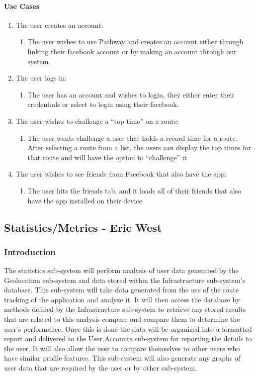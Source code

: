 ﻿\documentclass{article}
\begin{document}
\paragraph{Use Cases}
\begin{enumerate}
\item The user creates an account:
    \begin{enumerate}
    \item The user wishes to use Pathway and creates an account either through linking their facebook account or by making an account through our system.
    \end{enumerate}
\item The user logs in:
    \begin{enumerate}
    \item The user has an account and wishes to login, they either enter their credentials or select to login using their facebook.
    \end{enumerate}
\item The user wishes to challenge a “top time” on a route:
    \begin{enumerate}
    \item The user wants challenge a user that holds a record time for a route. After selecting a route from a list, the users can display the top times for that route and will have the option to “challenge” it
    \end{enumerate}
\item The user wishes to see friends from Facebook that also have the app:
    \begin{enumerate}
    \item The user hits the friends tab, and it loads all of their friends that also have the app installed on their device
    \end{enumerate}
\end{enumerate}

\newpage

\subsection{Statistics/Metrics - Eric West}
\subsubsection{Introduction}
The statistics sub-system will perform analysis of user data generated by the Geolocation sub-system and data stored within the Infrastructure sub-system's database. This sub-system will take data generated from the use of the route tracking of the application and analyze it. It will then access the database by methods defined by the Infrastructure sub-system to retrieve any stored results that are related to this analysis compare and compare them to determine the user's performance. Once this is done the data will be organized into a formatted report and delivered to the User Accounts sub-system for reporting the details to the user. It will also allow the user to compare themselves to other users who have similar profile features. This sub-system will also generate any graphs of user data that are required by the user or by other sub-system.
\end{document}
